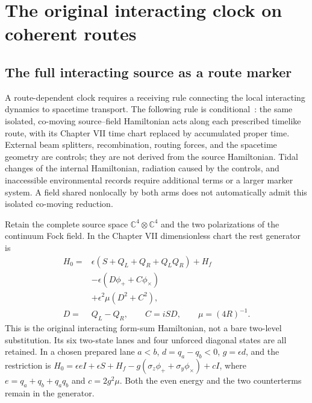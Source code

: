 \section{The original interacting clock on coherent routes}
\subsection{The full interacting source as a route marker}
\label{sec:ch6-clock-routes}
A route-dependent clock requires a receiving rule connecting the local
interacting dynamics to spacetime transport. The following rule is conditional~\cite{Zych2011}:
the same isolated, co-moving source--field Hamiltonian acts along each prescribed
timelike route, with its Chapter VII time chart replaced by accumulated proper
time. External beam splitters, recombination, routing forces, and the spacetime
geometry are controls; they are not derived from the source Hamiltonian.
Tidal changes of the internal Hamiltonian, radiation caused by the controls,
and inaccessible environmental records require additional terms or a larger
marker system. A field shared nonlocally by both arms does not automatically
admit this isolated co-moving reduction.

Retain the complete source space $\mathbb C^4\otimes\mathbb C^4$ and the two
polarizations of the continuum Fock field. In the Chapter VII dimensionless
chart the rest generator is
\begin{equation}
\begin{split}
 H_0={}&\epsilon(S+Q_L+Q_R+Q_LQ_R)+H_f\\
 &-\epsilon(D\phi_++C\phi_\times)\\
 &+\epsilon^2\mu(D^2+C^2),\\
 D={}&Q_L-Q_R,\qquad C=iSD,\qquad \mu=(4R)^{-1}.
\end{split}
\label{eq:ch6-full-clock-generator}
\end{equation}
This is the original interacting form-sum Hamiltonian, not a bare two-level
substitution. Its six two-state lanes and four unforced diagonal states are
all retained. In a chosen prepared lane $a<b$, $d=q_a-q_b<0$,
$g=\epsilon d$, and the restriction is
$H_0=\epsilon eI+\epsilon S+H_f-g(\sigma_z\phi_++\sigma_y\phi_\times)+cI$,
where $e=q_a+q_b+q_aq_b$ and $c=2g^2\mu$. Both the even energy and the two
counterterms remain in the generator.

